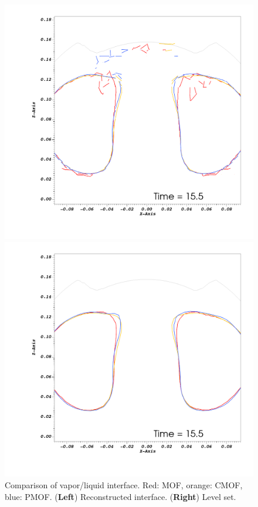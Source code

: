 \documentclass[preprint,12pt]{Definitions/elsarticle}
\begin{document}
\begin{figure}[H]
	\centering
	\begin{minipage}[b]{0.49\linewidth}
		\centering
		\includegraphics[width=1\textwidth]{tank_reconst2d.png}
	\end{minipage}
	\begin{minipage}[b]{0.49\linewidth}
		\centering
		\includegraphics[width=1\textwidth]{tankLS_compare.png}
	\end{minipage}
	\caption{Comparison of vapor/liquid interface. Red: MOF, orange: CMOF, blue: PMOF. (\textbf{Left}) Reconstructed interface. (\textbf{Right}) Level set. \label{reconstLScompare}}
\end{figure} 
\end{document}

